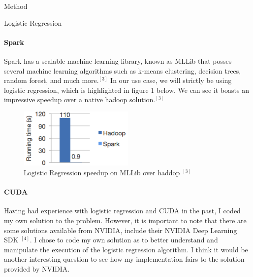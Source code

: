 \documentclass[11pt]{article}
\begin{document}
\begin{section}{Method}
\begin{subsection}{Logistic Regression}
		\paragraph{Spark}
		Spark has a scalable machine learning library, known as MLLib that posses several machine learning algorithms such as k-means clustering, decision trees, random forest, and much more.$^{[3]}$ In our use case, we will strictly be using logistic regression, which is highlighted in figure 1 below. We can see it boasts an impressive speedup over a native hadoop solution.$^{[3]}$
		
		\begin{figure}[H]
			\centering
			\includegraphics[width=0.5\textwidth]{../images/logistic-regressionSpark.png}
			\caption{Logistic Regression speedup on MLLib over haddop $^{[3]}$}
		\end{figure}
		\paragraph{CUDA}
		Having had experience with logistic regression and CUDA in the past, I coded my own solution to the problem. However, it is important to note that there are some solutions available from NVIDIA, include their NVIDIA Deep Learning SDK $^{[4]}$. I chose to code my own solution as to better understand and manipulate the execution of the logistic regression algorithm. I think it would be another interesting question to see how my implementation fairs to the solution provided by NVIDIA.
		
	\end{subsection}
\end{section}
\end{document}

